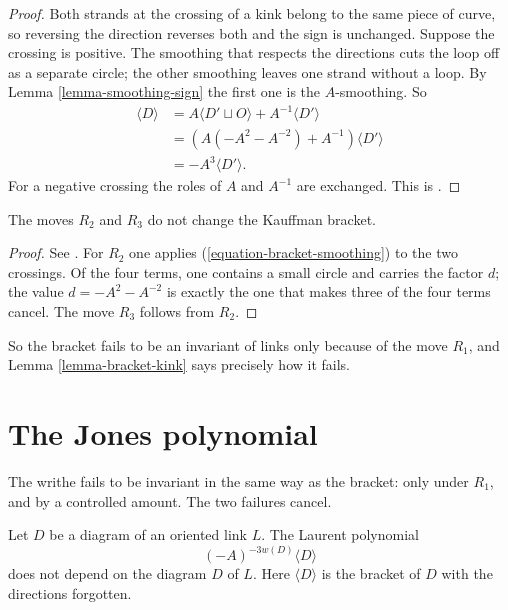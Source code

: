 \begin{proof}
Both strands at the crossing of a kink
belong to the same piece of curve, so
reversing the direction reverses both
and the sign is unchanged. Suppose the
crossing is positive. The smoothing
that respects the directions cuts the
loop off as a separate circle; the
other smoothing leaves one strand
without a loop. By
Lemma \ref{lemma-smoothing-sign}
the first one is the $A$-smoothing. So
$$
\begin{aligned}
\langle D\rangle
&=A\langle D'\sqcup O\rangle
+A^{-1}\langle D'\rangle\\
&=\left(A(-A^{2}-A^{-2})+A^{-1}\right)
\langle D'\rangle\\
&=-A^{3}\langle D'\rangle.
\end{aligned}
$$
For a negative crossing the roles of
$A$ and $A^{-1}$ are exchanged. This is
\cite[Lemma 3.2]{lickorish}.
\end{proof}

\begin{lemma}
\label{lemma-bracket-r2-r3}
The moves $R_2$ and $R_3$ do not change
the Kauffman bracket.
\end{lemma}

\begin{proof}
See \cite[Lemma 3.3]{lickorish}. For
$R_2$ one applies
(\ref{equation-bracket-smoothing}) to
the two crossings. Of the four terms,
one contains a small circle and carries
the factor $d$; the value
$d=-A^{2}-A^{-2}$ is exactly the one
that makes three of the four terms
cancel. The move $R_3$ follows from
$R_2$.
\end{proof}

\noindent
So the bracket fails to be an invariant
of links only because of the move
$R_1$, and
Lemma \ref{lemma-bracket-kink} says
precisely how it fails.

\section{The Jones polynomial}
\label{section-jones-polynomial}

\noindent
The writhe fails to be invariant in the
same way as the bracket: only under
$R_1$, and by a controlled amount. The
two failures cancel.

\begin{theorem}
\label{theorem-jones-invariant}
Let $D$ be a diagram of an oriented
link $L$. The Laurent polynomial
$$
(-A)^{-3w(D)}\langle D\rangle
$$
does not depend on the diagram $D$ of
$L$. Here $\langle D\rangle$ is the
bracket of $D$ with the directions
forgotten.
\end{theorem}


